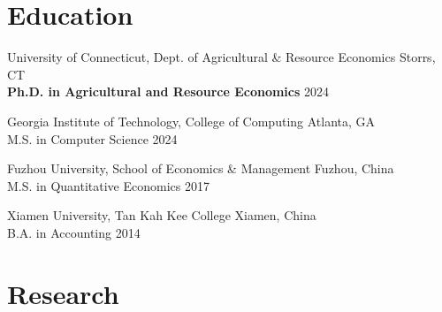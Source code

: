 \documentclass[10.5pt,letterpaper]{article}
\renewenvironment{itemize}{
	\begin{list}{}{
			\setlength{\leftmargin}{1.5em}
		}
	}{
	\end{list}
}
\begin{document}
	\section*{\textbf{Education}}
	\begin{itemize}
		\item[-] University of Connecticut, Dept. of Agricultural \& Resource Economics \hfill Storrs, CT \\
		\textbf{Ph.D. in Agricultural and Resource Economics} \hfill 2024
		
		\item[-] Georgia Institute of Technology, College of Computing \hfill Atlanta, GA \\
		M.S. in Computer Science \hfill 2024
		
		\item[-] Fuzhou University, School of Economics \& Management \hfill Fuzhou, China \\
		M.S. in Quantitative Economics \hfill 2017
		
		\item[-] Xiamen University, Tan Kah Kee College \hfill Xiamen, China \\
		B.A. in Accounting \hfill 2014
	\end{itemize}
	
	\section*{\textbf{Research}}
	
\end{document}
